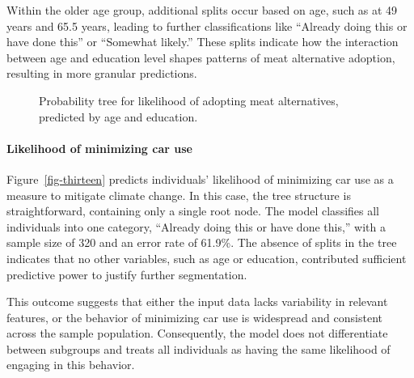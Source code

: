 \documentclass[
  letterpaper,
  DIV=11,
  numbers=noendperiod]{scrartcl}
\let\oldparagraph\paragraph
\renewcommand{\paragraph}[1]{\oldparagraph{#1}\mbox{}}
\begin{document}
Within the older age group, additional splits occur based on age, such
as at 49 years and 65.5 years, leading to further classifications like
``Already doing this or have done this'' or ``Somewhat likely.'' These
splits indicate how the interaction between age and education level
shapes patterns of meat alternative adoption, resulting in more granular
predictions.

\begin{figure}


\caption{\label{fig-twelve}Probability tree for likelihood of adopting
meat alternatives, predicted by age and education.}

\end{figure}%

\paragraph{Likelihood of minimizing car
use}\label{likelihood-of-minimizing-car-use}

Figure~\ref{fig-thirteen} predicts individuals' likelihood of minimizing
car use as a measure to mitigate climate change. In this case, the tree
structure is straightforward, containing only a single root node. The
model classifies all individuals into one category, ``Already doing this
or have done this,'' with a sample size of 320 and an error rate of
61.9\%. The absence of splits in the tree indicates that no other
variables, such as age or education, contributed sufficient predictive
power to justify further segmentation.

This outcome suggests that either the input data lacks variability in
relevant features, or the behavior of minimizing car use is widespread
and consistent across the sample population. Consequently, the model
does not differentiate between subgroups and treats all individuals as
having the same likelihood of engaging in this behavior.
\end{document}
